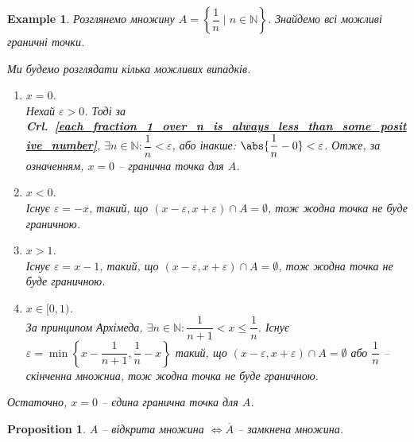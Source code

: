 \documentclass[a4paper, 14pt]{article}
\theoremstyle{theoremdd}
\theoremstyle{theoremdd}
\theoremstyle{theoremdd}
\theoremstyle{theoremdd}
\newtheorem{example}[theorem]{Example}
\theoremstyle{theoremdd}
\newtheorem{proposition}[theorem]{Proposition}
\theoremstyle{theoremdd}
\theoremstyle{theoremdd}
\theoremstyle{theoremdd}
\newcommand\crlref[1]{\textbf{Crl.~\ref{#1}}}
\begin{document}
\begin{example}
Розглянемо множину $A = \left\{ \dfrac{1}{n} \mid n \in \mathbb{N} \right\}$. Знайдемо всі можливі граничні точки.
\begin{figure}[H]
\centering
{}
\end{figure}
Ми будемо розглядати кілька можливих випадків.
\begin{enumerate}[wide=0pt,label={\Roman*.}]
\item $x = 0$.\\
Нехай $\varepsilon > 0$. Тоді за \crlref{each_fraction_1_over_n_is_always_less_than_some_positive_number}, $\exists n \in \mathbb{N}: \dfrac{1}{n} < \varepsilon$, або інакше: $\abs{\dfrac{1}{n}-0} < \varepsilon$. Отже, за означенням, $x = 0$ -- гранична точка для $A$.
\item $x < 0$.\\
Існує $\varepsilon = -x$, такий, що $(x-\varepsilon,x+\varepsilon) \cap A = \emptyset$, тож жодна точка не буде граничною.
\item $x > 1$.\\
Існує $\varepsilon = x-1$, такий, що $(x-\varepsilon,x+\varepsilon) \cap A = \emptyset$, тож жодна точка не буде граничною.
\item $x \in [0,1)$.\\
За принципом Архімеда, $\exists n \in \mathbb{N}: \dfrac{1}{n+1} < x \leq \dfrac{1}{n}$. Існує $\varepsilon = \min \left\{ x - \dfrac{1}{n+1}, \dfrac{1}{n} - x \right\}$ такий, що $(x-\varepsilon, x+\varepsilon) \cap A = \emptyset$ або $\dfrac{1}{n}$ -- скінченна множниа, тож жодна точка не буде граничною.
\end{enumerate}
Остаточно, $x = 0$ -- єдина гранична точка для $A$.
\end{example}

\begin{proposition}
\label{open_iff_complement_closed}
$A$ -- відкрита множина $\iff \overline{A}$ -- замкнена множина.
\end{proposition}
\end{document}
